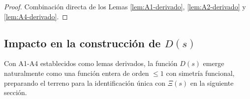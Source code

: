 \begin{proof}
Combinación directa de los Lemas \ref{lem:A1-derivado}, \ref{lem:A2-derivado} y \ref{lem:A4-derivado}.
\end{proof}

\subsection*{Impacto en la construcción de $D(s)$}

Con A1-A4 establecidos como lemas derivados, la función $D(s)$ emerge naturalmente como una función entera de orden $\leq 1$ con simetría funcional, preparando el terreno para la identificación única con $\Xi(s)$ en la siguiente sección.
